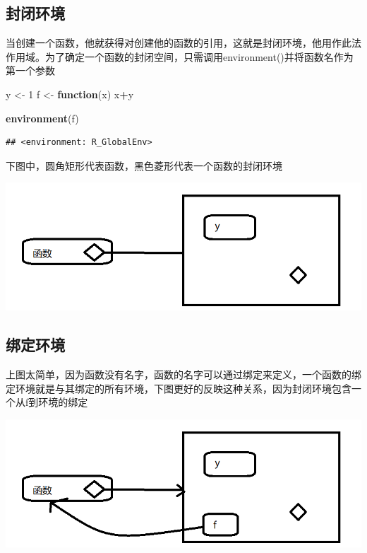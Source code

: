 \documentclass[]{book}
\newenvironment{Shaded}{\begin{snugshade}}{\end{snugshade}}
\newcommand{\KeywordTok}[1]{\textcolor[rgb]{0.13,0.29,0.53}{\textbf{#1}}}
\newcommand{\DecValTok}[1]{\textcolor[rgb]{0.00,0.00,0.81}{#1}}
\newcommand{\StringTok}[1]{\textcolor[rgb]{0.31,0.60,0.02}{#1}}
\newcommand{\ControlFlowTok}[1]{\textcolor[rgb]{0.13,0.29,0.53}{\textbf{#1}}}
\newcommand{\OperatorTok}[1]{\textcolor[rgb]{0.81,0.36,0.00}{\textbf{#1}}}
\newcommand{\NormalTok}[1]{#1}
\begin{document}
\subsection{封闭环境}

当创建一个函数，他就获得对创建他的函数的引用，这就是封闭环境，他用作此法作用域。为了确定一个函数的封闭空间，只需调用environment()并将函数名作为第一个参数

\begin{Shaded}
\begin{Highlighting}[]
\NormalTok{y <-}\StringTok{ }\DecValTok{1}
\NormalTok{f <-}\StringTok{ }\ControlFlowTok{function}\NormalTok{(x) x}\OperatorTok{+}\NormalTok{y}

\KeywordTok{environment}\NormalTok{(f)}
\end{Highlighting}
\end{Shaded}

\begin{verbatim}
## <environment: R_GlobalEnv>
\end{verbatim}

下图中，圆角矩形代表函数，黑色菱形代表一个函数的封闭环境

\begin{center}\includegraphics{img/ch7-6} \end{center}

\subsection{绑定环境}

上图太简单，因为函数没有名字，函数的名字可以通过绑定来定义，一个函数的绑定环境就是与其绑定的所有环境，下图更好的反映这种关系，因为封闭环境包含一个从f到环境的绑定

\begin{center}\includegraphics{img/ch7-7} \end{center}
\end{document}
